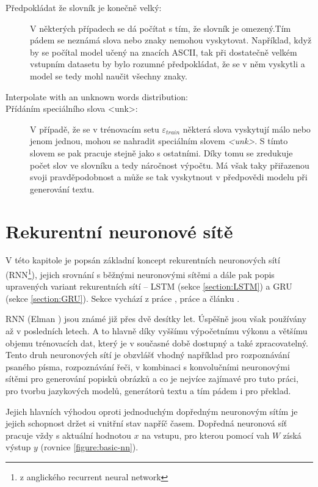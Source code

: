 \begin{description}
  \item[Předpokládat že slovník je konečně velký:] V některých případech se dá počítat s tím, že slovník je omezený.Tím pádem se neznámá slova nebo znaky nemohou vyskytovat. Například, když by se počítal model učený na znacích ASCII, tak při dostatečně velkém vstupním datasetu by bylo rozumné předpokládat, že se v něm vyskytli a model se tedy mohl naučit všechny znaky.
  \item[Interpolate with an unknown words distribution:] 
  \item[Přídáním speciálního slova <unk>:]\label{description:unk}V případě, že se v trénovacím setu $\varepsilon_{train}$ některá slova vyskytují málo nebo jenom jednou, mohou se nahradit speciálním slovem \emph{<unk>}. S tímto slovem se pak pracuje stejně jako s ostatními. Díky tomu se zredukuje počet slov ve slovníku a tedy náročnost výpočtu. Má však taky přiřazenou svoji pravděpodobnost a může se tak vyskytnout v předpovědi modelu při generování textu. 
\end{description}

\section{Rekurentní neuronové sítě}\label{section:rnn}
V této kapitole je popsán základní koncept rekurentních neuronových sítí (RNN\footnote{z anglického recurrent neural network}), jejich srovnání s běžnými neuronovými sítěmi a dále pak popis upravených variant rekurentních sítí -- LSTM (sekce \ref{section:LSTM}) a GRU (sekce \ref{section:GRU}). Sekce vychází z práce \cite{nmtThesis}, práce \cite{nmtTutorial} a článku \cite{understandingLSTM}.


RNN (Elman \cite{rnn}) jsou známé již přes dvě desítky let. Úspěšně jsou však používány až v posledních letech. A to hlavně díky vyššímu výpočetnímu výkonu a většímu objemu trénovacích dat, který je v současné době dostupný a také zpracovatelný. Tento druh neuronových sítí je obzvlášť vhodný například pro rozpoznávání psaného písma, rozpoznávání řeči, v kombinaci s konvolučními neuronovými sítěmi pro generování popisků obrázků a co je nejvíce zajímavé pro tuto práci, pro tvorbu jazykových modelů, generátorů textu a tím pádem i pro překlad.

Jejich hlavních výhodou oproti jednoduchým dopředným neuronovým sítím je jejich schopnost držet si vnitřní stav napříč časem. Dopředná neuronová síť pracuje vždy s aktuální hodnotou $x$ na vstupu, pro kterou pomocí vah $W$ získá výstup $y$ (rovnice \ref{figure:basic-nn}). 


